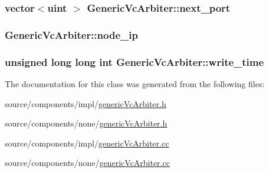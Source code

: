 \hypertarget{classGenericVcArbiter_1538dd58584a6130c0846fa7da7a376d}{
\subsubsection[{next\_\-port}]{\setlength{\rightskip}{0pt plus 5cm}vector$<${\bf uint} $>$ {\bf GenericVcArbiter::next\_\-port}}}
\label{classGenericVcArbiter_1538dd58584a6130c0846fa7da7a376d}


\hypertarget{classGenericVcArbiter_f5fe6167805ebb6bda85e58535b6f51e}{
\subsubsection[{node\_\-ip}]{ {\bf GenericVcArbiter::node\_\-ip}}}
\label{classGenericVcArbiter_f5fe6167805ebb6bda85e58535b6f51e}


\hypertarget{classGenericVcArbiter_92c6b36810e3ca21255596f2fde60a96}{
\subsubsection[{write\_\-time}]{\setlength{\rightskip}{0pt plus 5cm}unsigned long long int {\bf GenericVcArbiter::write\_\-time}}}
\label{classGenericVcArbiter_92c6b36810e3ca21255596f2fde60a96}




The documentation for this class was generated from the following files:\begin{CompactItemize}
\item 
source/components/impl/\hyperlink{impl_2genericVcArbiter_8h}{genericVcArbiter.h}\item 
source/components/none/\hyperlink{none_2genericVcArbiter_8h}{genericVcArbiter.h}\item 
source/components/impl/\hyperlink{impl_2genericVcArbiter_8cc}{genericVcArbiter.cc}\item 
source/components/none/\hyperlink{none_2genericVcArbiter_8cc}{genericVcArbiter.cc}\end{CompactItemize}
